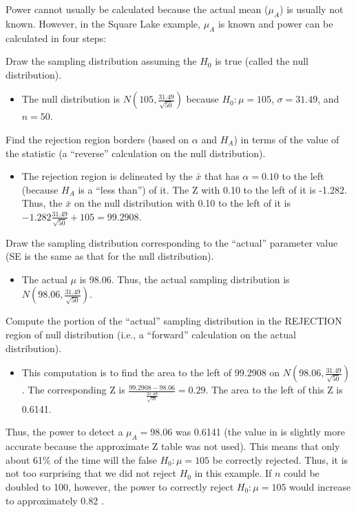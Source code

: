 \documentclass[10pt,openany]{book}\usepackage[]{graphicx}\usepackage[]{color}
\begin{document}
Power cannot usually be calculated because the actual mean ($\mu_{A}$) is usually not known.  However, in the Square Lake example, $\mu_{A}$ is known and power can be calculated in four steps:
\begin{Enumerate}
 \item Draw the sampling distribution assuming the $H_{0}$ is true (called the null distribution).
 \begin{itemize}
   \item The null distribution is $N(105,\frac{31.49}{\sqrt{50}})$ because $H_{0}:\mu=105$, $\sigma=31.49$, and $n=50$.
 \end{itemize}
 \item Find the rejection region borders (based on $\alpha$ and $H_{A}$) in terms of the value of the statistic (a ``reverse'' calculation on the null distribution).
 \begin{itemize}
   \item The rejection region is delineated by the $\bar{x}$ that has $\alpha=0.10$ to the left (because $H_{A}$ is a ``less than'') of it.  The Z with 0.10 to the left of it is -1.282.  Thus, the $\bar{x}$ on the null distribution with 0.10 to the left of it is $-1.282\frac{31.49}{\sqrt{50}}+105 = 99.2908$.
 \end{itemize}
 \item Draw the sampling distribution corresponding to the ``actual'' parameter value (SE is the same as that for the null distribution).
 \begin{itemize}
   \item The actual $\mu$ is 98.06.  Thus, the actual sampling distribution is $N(98.06,\frac{31.49}{\sqrt{50}})$.
 \end{itemize}
 \item Compute the portion of the ``actual'' sampling distribution in the REJECTION region of null distribution (i.e., a ``forward'' calculation on the actual distribution).
 \begin{itemize}
   \item This computation is to find the area to the left of 99.2908 on $N(98.06,\frac{31.49}{\sqrt{50}})$.  The corresponding Z is $\frac{99.2908-98.06}{\frac{31.49}{\sqrt{50}}}=0.29$.  The area to the left of this Z is 0.6141.
 \end{itemize}
\end{Enumerate}

Thus, the power to detect a $\mu_{A}=98.06$ was 0.6141 (the value in  is slightly more accurate because the approximate Z table was not used).  This means that only about 61\% of the time will the false $H_{0}:\mu=105$ be correctly rejected.  Thus, it is not too surprising that we did not reject $H_{0}$ in this example.  If $n$ could be doubled to 100, however, the power to correctly reject $H_{0}:\mu=105$ would increase to approximately 0.82 .
\end{document}
